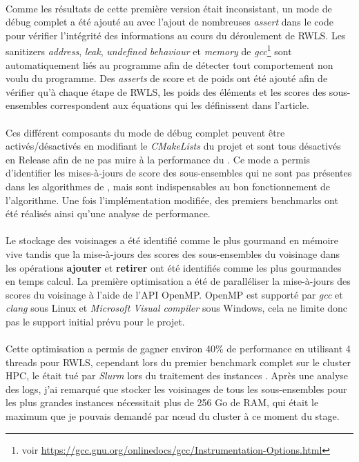 \documentclass[a4paper,11pt,twoside,french,report]{../common/simplem}
\begin{document}
				\paragraph*{}
					Comme les résultats de cette première version était inconsistant, un mode de débug complet a été ajouté au \solver{} avec l'ajout de nombreuses \textit{assert} dans le code pour vérifier l'intégrité des informations au cours du déroulement de \gls{RWLS}. Les sanitizers \textit{address}, \textit{leak}, \textit{undefined behaviour} et \textit{memory} de \textit{gcc}\footnote{voir \url{https://gcc.gnu.org/onlinedocs/gcc/Instrumentation-Options.html}} sont automatiquement liés au programme afin de détecter tout comportement non voulu du programme. Des \textit{asserts} de score et de poids ont été ajouté afin de vérifier qu'à chaque étape de \gls{RWLS}, les poids des éléments et les scores des sous-ensembles correspondent aux équations qui les définissent dans l'article.
				\paragraph*{}
					Ces différent composants du mode de débug complet peuvent être activés/désactivés en modifiant le \textit{CMakeLists} du projet et sont tous désactivés en Release afin de ne pas nuire à la performance du \solver{}. Ce mode a permis d'identifier les mises-à-jours de score des sous-ensembles qui ne sont pas présentes dans les algorithmes de \cite{Gao2015}, mais sont indispensables au bon fonctionnement de l'algorithme. Une fois l'implémentation modifiée, des premiers benchmarks ont été réalisés ainsi qu'une analyse de performance.
				\paragraph*{}
					Le stockage des voisinages a été identifié comme le plus gourmand en mémoire vive tandis que la mise-à-jours des scores des sous-ensembles du voisinage dans les opérations \textbf{ajouter} et \textbf{retirer} ont été identifiés comme les plus gourmandes en temps calcul. La première optimisation a été de paralléliser la mise-à-jours des scores du voisinage à l'aide de l'\gls{API} \gls{OpenMP}. \gls{OpenMP} est supporté par \textit{gcc} et \textit{clang} sous Linux et \textit{Microsoft Visual \Cpp{} compiler} sous Windows, cela ne limite donc pas le support initial prévu pour le projet.
				\paragraph*{}
					Cette optimisation a permis de gagner environ 40\% de performance en utilisant 4 threads pour \gls{RWLS}, cependant lors du premier benchmark complet sur le cluster \gls{HPC}, le \solver{} était tué par \textit{Slurm} lors du traitement des instances . Après une analyse des logs, j'ai remarqué que stocker les voisinages de tous les sous-ensembles pour les plus grandes instances  nécessitait plus de 256 Go de RAM, qui était le maximum que je pouvais demandé par nœud du cluster à ce moment du stage.
\end{document}
